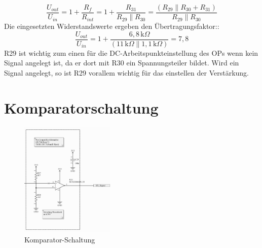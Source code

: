 \begin{equation}
    \frac{U_{out}}{U_{in}} = 1 + \frac{R_f}{R_{int}} = 1 + \frac{R_{31}}{R_{29}\parallel R_{30}}=\frac{(R_{29} \parallel R_{30}+R_{31})}{R_{29}\parallel R_{30}}
\end{equation}
Die eingesetzten Widerstandswerte ergeben den Übertragungsfaktor::
\begin{equation}
    \frac{U_{out}}{U_{in}} = 1 + \frac{6,8\,\mathrm{k}\Omega}{(11\,\mathrm{k}\Omega \parallel 1,1\,\mathrm{k}\Omega)} = 7,8
\end{equation}
R29 ist wichtig zum einen für die DC-Arbeitspunkteinstellung des OPs wenn kein Signal angelegt ist, da er dort mit R30 ein Spannungsteiler bildet.
Wird ein Signal angelegt, so ist R29 vorallem wichtig für das einstellen der Verstärkung.

\section{Komparatorschaltung} %

\begin{figure}[H]
    \centering
    \includegraphics[width=0.4\textwidth]{Pictures/Komparator.png}
    \caption{Komparator-Schaltung}
    \label{fig:opamp_schaltung}
\end{figure}

